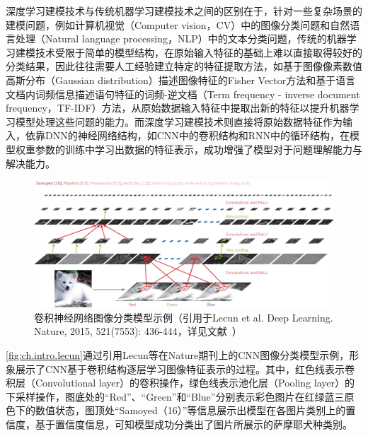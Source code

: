 深度学习建模技术与传统机器学习建模技术之间的区别在于，针对一些复杂场景的建模问题，例如计算机视觉（Computer vision，CV）中的图像分类问题\cite{dengImageNet2009}和自然语言处理（Natural language processing，NLP）中的文本分类问题\cite{maasLearning2011}，传统的机器学习建模技术受限于简单的模型结构，在原始输入特征的基础上难以直接取得较好的分类结果，因此往往需要人工经验建立特定的特征提取方法，如基于图像像素数值高斯分布（Gaussian distribution）描述图像特征的Fisher Vector方法\cite{sanchezHighdimensional2011,sanchezImage2013,perronninLargescale2010}和基于语言文档内词频信息描述语句特征的词频-逆文档（Term frequency - inverse document frequency，TF-IDF）方法\cite{aizawaInformationtheoretic2003,jonesStatistical1972,luhnStatistical1957}，从原始数据输入特征中提取出新的特征以提升机器学习模型处理这些问题的能力。而深度学习建模技术则直接将原始数据特征作为输入，依靠DNN的神经网络结构，如CNN中的卷积结构和RNN中的循环结构，在模型权重参数的训练中学习出数据的特征表示，成功增强了模型对于问题理解能力与解决能力。

\begin{figure}[t!]
    \centering
    \includegraphics[width = \linewidth]{float/ch.intro/lecun.png}
    \caption{卷积神经网络图像分类模型示例（引用于Lecun et al. Deep Learning. Nature, 2015, 521(7553): 436-444，详见文献~\cite{lecunDeep2015}）} 
    \label{fig:ch.intro.lecun}
\end{figure}

\autoref{fig:ch.intro.lecun}通过引用Lecun等\cite{lecunDeep2015}在Nature期刊上的CNN图像分类模型示例，形象展示了CNN基于卷积结构逐层学习图像特征表示的过程。其中，红色线表示卷积层（Convolutional layer）的卷积操作，绿色线表示池化层（Pooling layer）的下采样操作，图底处的“Red”、“Green”和“Blue”分别表示彩色图片在红绿蓝三原色下的数值状态，图顶处“Samoyed（16）”等信息展示出模型在各图片类别上的置信度，基于置信度信息，可知模型成功分类出了图片所展示的萨摩耶犬种类别。


